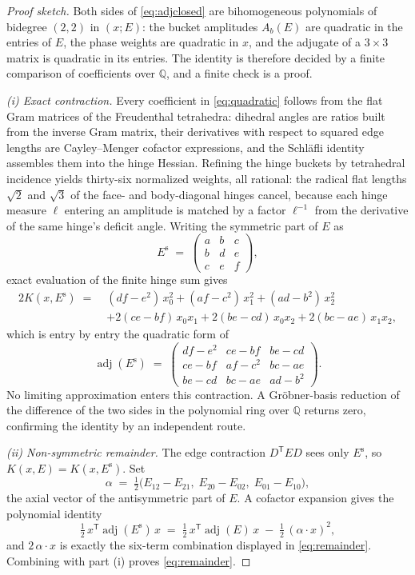 \documentclass[11pt]{article}
\theoremstyle{definition}
\theoremstyle{remark}
\DeclareMathOperator{\adjE}{adj}
\newcommand{\trans}{\mathsf{T}}
\begin{document}
\begin{proof}[Proof sketch]
Both sides of \eqref{eq:adjclosed} are bihomogeneous polynomials of bidegree $(2,2)$ in $(x;E)$: the bucket amplitudes $A_b(E)$ are quadratic in the entries of $E$, the phase weights are quadratic in $x$, and the adjugate of a $3\times 3$ matrix is quadratic in its entries. The identity is therefore decided by a finite comparison of coefficients over $\mathbb{Q}$, and a finite check is a proof.

\emph{(i) Exact contraction.} Every coefficient in \eqref{eq:quadratic} follows from the flat Gram matrices of the Freudenthal tetrahedra: dihedral angles are ratios built from the inverse Gram matrix, their derivatives with respect to squared edge lengths are Cayley--Menger cofactor expressions, and the Schl\"afli identity assembles them into the hinge Hessian. Refining the hinge buckets by tetrahedral incidence yields thirty-six normalized weights, all rational: the radical flat lengths $\sqrt2$ and $\sqrt3$ of the face- and body-diagonal hinges cancel, because each hinge measure $\ell$ entering an amplitude is matched by a factor $\ell^{-1}$ from the derivative of the same hinge's deficit angle. Writing the symmetric part of $E$ as
\begin{equation}
E^{\mathrm s} \;=\;
\begin{pmatrix}
a & b & c\\
b & d & e\\
c & e & f
\end{pmatrix},
\end{equation}
exact evaluation of the finite hinge sum gives
\begin{align}
2K(x,E^{\mathrm s})
\;=\;{}& (df-e^2)\,x_0^2 + (af-c^2)\,x_1^2 + (ad-b^2)\,x_2^2
\nonumber\\
&+ 2(ce-bf)\,x_0x_1 + 2(be-cd)\,x_0x_2 + 2(bc-ae)\,x_1x_2,
\label{eq:expanded}
\end{align}
which is entry by entry the quadratic form of
\begin{equation}
\adjE(E^{\mathrm s}) \;=\;
\begin{pmatrix}
df-e^2 & ce-bf & be-cd\\
ce-bf & af-c^2 & bc-ae\\
be-cd & bc-ae & ad-b^2
\end{pmatrix}.
\end{equation}
No limiting approximation enters this contraction. A Gr\"obner-basis reduction of the difference of the two sides in the polynomial ring over $\mathbb{Q}$ returns zero, confirming the identity by an independent route.

\emph{(ii) Non-symmetric remainder.} The edge contraction $D^{\trans}ED$ sees only $E^{\mathrm s}$, so $K(x,E)=K(x,E^{\mathrm s})$. Set
\[
\alpha \;=\; \tfrac12\bigl(E_{12}-E_{21},\; E_{20}-E_{02},\; E_{01}-E_{10}\bigr),
\]
the axial vector of the antisymmetric part of $E$. A cofactor expansion gives the polynomial identity
\[
\tfrac12\,x^{\trans}\adjE(E^{\mathrm s})\,x \;=\; \tfrac12\,x^{\trans}\adjE(E)\,x \;-\; \tfrac12\,(\alpha\cdot x)^2,
\]
and $2\,\alpha\cdot x$ is exactly the six-term combination displayed in \eqref{eq:remainder}. Combining with part (i) proves \eqref{eq:remainder}.
\end{proof}
\end{document}
